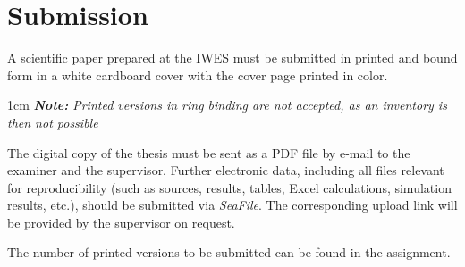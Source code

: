 \section{Submission}
\label{sec:submission}

A scientific paper prepared at the IWES must be submitted in printed and bound form in a white cardboard cover with the cover page printed in color. 

\begin{addmargin}[1cm]{1cm}
	\textit{\textbf{Note:} Printed versions in ring binding are not accepted, as an inventory is then not possible}
\end{addmargin}



The digital copy of the thesis must be sent as a PDF file by e-mail to the examiner and the supervisor. Further electronic data, including all files relevant for reproducibility (such as sources, results, tables, Excel calculations, simulation results, etc.), should be submitted via \textit{SeaFile}. The corresponding upload link will be provided by the supervisor on request.

The number of printed versions to be submitted can be found in the assignment.





